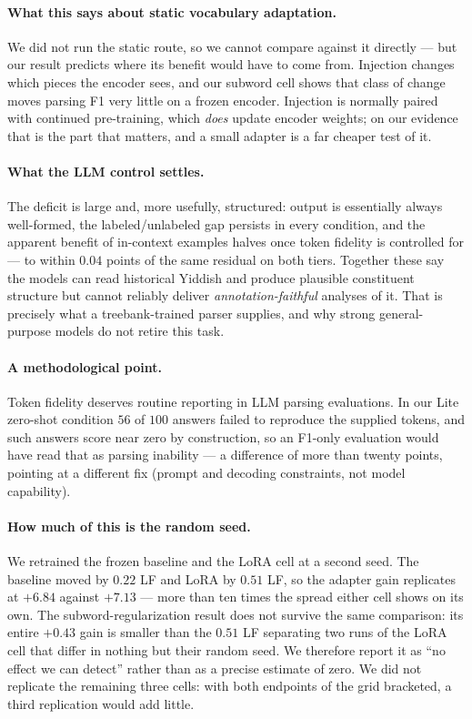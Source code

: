 \documentclass[11pt]{article}
\begin{document}
\paragraph{What this says about static vocabulary adaptation.} We did not run
the static route, so we cannot compare against it directly --- but our result
predicts where its benefit would have to come from. Injection changes which pieces
the encoder sees, and our subword cell shows that class of change moves parsing F1
very little on a frozen encoder. Injection is normally paired with continued
pre-training, which \emph{does} update encoder weights; on our evidence that is
the part that matters, and a small adapter is a far cheaper test of it.

\paragraph{What the LLM control settles.} The deficit is large and, more
usefully, structured: output is essentially always well-formed, the
labeled/unlabeled gap persists in every condition, and the apparent benefit of
in-context examples halves once token fidelity is controlled for --- to within
$0.04$ points of the same residual on both tiers. Together these say the models
can read historical Yiddish and produce plausible constituent structure but cannot
reliably deliver \emph{annotation-faithful} analyses of it. That is precisely what
a treebank-trained parser supplies, and why strong general-purpose models do not
retire this task.

\paragraph{A methodological point.} Token fidelity deserves routine reporting in
LLM parsing evaluations. In our Lite zero-shot condition $56$ of $100$ answers
failed to reproduce the supplied tokens, and such answers score near zero by
construction, so an F1-only evaluation would have read that as parsing inability
--- a difference of more than twenty points, pointing at a different fix (prompt
and decoding constraints, not model capability).

\paragraph{How much of this is the random seed.} We retrained the frozen
baseline and the LoRA cell at a second seed. The baseline moved by $0.22$ LF and
LoRA by $0.51$ LF, so the adapter gain replicates at $+6.84$ against $+7.13$ ---
more than ten times the spread either cell shows on its own. The
subword-regularization result does not survive the same comparison: its entire
$+0.43$ gain is smaller than the $0.51$ LF separating two runs of the LoRA cell
that differ in nothing but their random seed. We therefore report it as ``no
effect we can detect'' rather than as a precise estimate of zero. We did not
replicate the remaining three cells: with both endpoints of the grid bracketed, a
third replication would add little.
\end{document}
